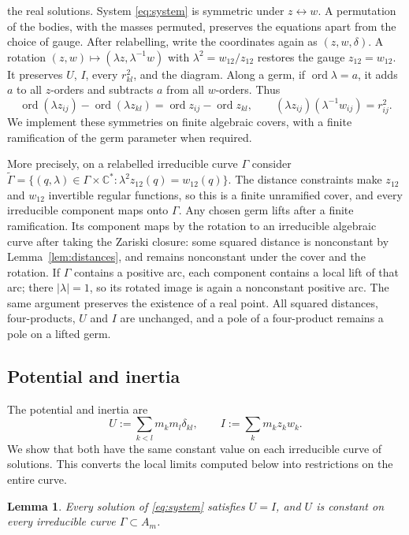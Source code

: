 \documentclass[Threeside,11pt]{article}
\newtheorem{lemma}[theorem]{Lemma}
\theoremstyle{definition}
\theoremstyle{remark}
\numberwithin{equation}{section}
\newcommand{\C}{\mathbb C}\newcommand{\T}{\mathbb T}
\theoremstyle{remark}
\newcommand{\ord}{\operatorname{ord}}
\begin{document}
{the real solutions.  System \eqref{eq:system} is symmetric under $z\leftrightarrow w$.  A permutation of the bodies,
with the masses permuted, preserves the equations apart from the choice of gauge.  After
relabelling, write the coordinates again as $(z,w,\delta)$.  A rotation
$(z,w)\mapsto(\lambda z,\lambda^{-1}w)$ with $\lambda^2=w_{12}/z_{12}$ restores the gauge
$z_{12}=w_{12}$.  It preserves $U$, $I$, every $r_{kl}^2$, and the diagram.  Along a germ,
if $\ord\lambda=a$, it adds $a$ to all $z$-orders and subtracts $a$ from all $w$-orders.  Thus
\[
 \ord(\lambda z_{ij})-\ord(\lambda z_{kl})
 =\ord z_{ij}-\ord z_{kl},\qquad
 (\lambda z_{ij})(\lambda^{-1}w_{ij})=r_{ij}^2.
\]
We implement these symmetries on finite algebraic covers, with a finite ramification of
the germ parameter when required.

More precisely, on a relabelled irreducible curve $\Gamma$ consider
$\widetilde\Gamma=\{(q,\lambda)\in\Gamma\times\C^*:
\lambda^2z_{12}(q)=w_{12}(q)\}$.  The distance constraints make $z_{12}$ and $w_{12}$ invertible regular
functions, so this is a finite unramified cover, and every irreducible component maps onto
$\Gamma$.  Any chosen germ lifts after a finite ramification.  Its component maps by the
rotation to an irreducible algebraic curve after taking the Zariski closure: some squared
distance is nonconstant by Lemma~\ref{lem:distances}, and remains nonconstant under the
cover and the rotation.  If $\Gamma$ contains a positive arc, each component contains a
local lift of that arc; there $|\lambda|=1$, so its rotated image is again a nonconstant
positive arc.  The same argument preserves the existence of a real point.  All squared
distances, four-products, $U$ and $I$ are unchanged, and a pole of a four-product remains
a pole on a lifted germ.}

\subsection{Potential and inertia}
The potential and inertia are
\[
 U:=\sum_{k<l}m_km_l\delta_{kl},\qquad I:=\sum_km_kz_kw_k.
\]
We show that both have the same constant value on each irreducible curve of solutions.
This converts the local limits computed below into restrictions on the entire curve.

\begin{lemma}\label{lem:U-constant}
Every solution of \eqref{eq:system} satisfies $U=I$, and $U$ is constant on every irreducible
curve $\Gamma\subset A_m$.
\end{lemma}
\end{document}
